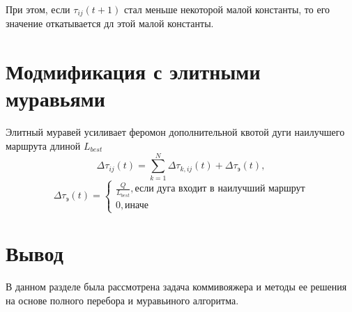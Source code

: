При этом, если $\tau_{ij}(t+1)$ стал меньше некоторой малой константы, то его значение откатывается дл этой малой константы.

\section{Модмификация с элитными муравьями}
Элитный муравей усиливает феромон дополнительной квотой дуги наилучшего маршрута длиной $L_{best}$
\begin{equation}
	\Delta \tau_{ij}(t) = \sum_{k=1}^N \Delta \tau_{k,ij}(t) + \Delta \tau_{э}(t),
\end{equation}
\begin{equation}
	\Delta \tau_{э}(t) = \begin{cases}
		\frac{Q}{L_{best}}, \textrm{если дуга входит в наилучший маршрут} \\
		0, \textrm{иначе}
	\end{cases}
\end{equation}

\section*{Вывод}
В данном разделе была рассмотрена задача коммивояжера и методы ее решения на основе полного перебора и муравьиного алгоритма.
\clearpage
